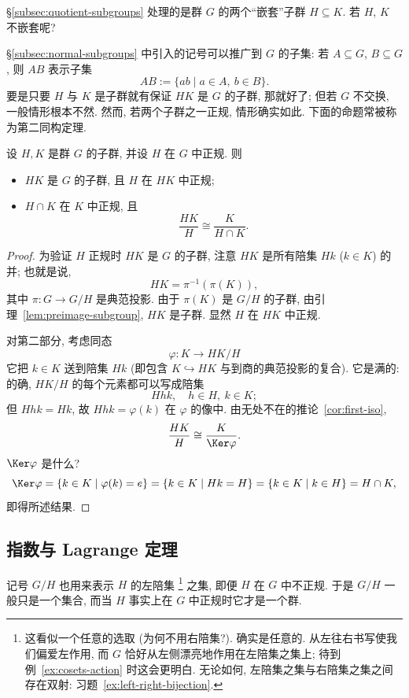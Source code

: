 \S\ref{subsec:quotient-subgroups} 处理的是群 $G$ 的两个``嵌套''子群 $H \subseteq K$. 若 $H$, $K$ 不嵌套呢?

\S\ref{subsec:normal-subgroups} 中引入的记号可以推广到 $G$ 的子集: 若 $A \subseteq G$, $B \subseteq G$, 则 $AB$ 表示子集
\[
AB := \{ab \mid a \in A,\ b \in B\}.
\]
要是只要 $H$ 与 $K$ 是子群就有保证 $HK$ 是 $G$ 的子群, 那就好了; 但若 $G$ 不交换, 一般情形根本不然. 然而, 若两个子群之一正规, 情形确实如此. 下面的命题常被称为第二同构定理.

\begin{proposition}
\label{prop:second-iso}
设 $H, K$ 是群 $G$ 的子群, 并设 $H$ 在 $G$ 中正规. 则
\begin{itemize}
	\item $HK$ 是 $G$ 的子群, 且 $H$ 在 $HK$ 中正规;
	\item $H \cap K$ 在 $K$ 中正规, 且
	\[
	\frac{HK}{H} \cong \frac{K}{H \cap K}.
	\]
\end{itemize}
\end{proposition}

\begin{proof}
为验证 $H$ 正规时 $HK$ 是 $G$ 的子群, 注意 $HK$ 是所有陪集 $Hk$ ($k \in K$) 的并; 也就是说,
\[
HK = \pi^{-1}(\pi(K)),
\]
其中 $\pi : G \to G/H$ 是典范投影. 由于 $\pi(K)$ 是 $G/H$ 的子群, 由引理~\ref{lem:preimage-subgroup}, $HK$ 是子群. 显然 $H$ 在 $HK$ 中正规.

对第二部分, 考虑同态
\[
\varphi : K \to HK/H
\]
它把 $k \in K$ 送到陪集 $Hk$ (即包含 $K \hookrightarrow HK$ 与到商的典范投影的复合). 它是满的: 的确, $HK/H$ 的每个元素都可以写成陪集
\[
Hhk, \quad h \in H,\ k \in K;
\]
但 $Hhk = Hk$, 故 $Hhk = \varphi(k)$ 在 $\varphi$ 的像中. 由无处不在的推论~\ref{cor:first-iso},
\[
\frac{HK}{H} \cong \frac{K}{\Ker \varphi}.
\]
$\Ker \varphi$ 是什么?
\[
\Ker \varphi = \{k \in K \mid \varphi(k) = e\} = \{k \in K \mid Hk = H\} = \{k \in K \mid k \in H\} = H \cap K,
\]
即得所述结果.
\end{proof}

\subsection{指数与 Lagrange 定理}
\label{subsec:index-lagrange}

记号 $G/H$ 也用来表示 $H$ 的左陪集%
\footnote{这看似一个任意的选取 (为何不用右陪集?). 确实是任意的. 从左往右书写使我们偏爱左作用, 而 $G$ 恰好从左侧漂亮地作用在左陪集之集上; 待到例~\ref{ex:cosets-action} 时这会更明白. 无论如何, 左陪集之集与右陪集之集之间存在双射: 习题~\ref{ex:left-right-bijection}.}%
之集, 即便 $H$ 在 $G$ 中不正规. 于是 $G/H$ 一般只是一个集合, 而当 $H$ 事实上在 $G$ 中正规时它才是一个群.


